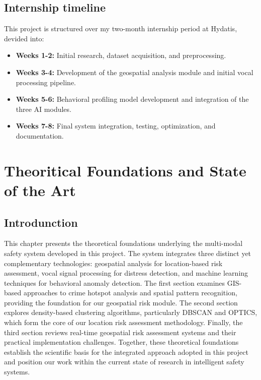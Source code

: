 \documentclass[12pt,a4paper,oneside,english]{book}
\begin{document}
{\section{Internship timeline }%

This project is structured over my two-month internship period at Hydatis, devided into:
\begin{itemize}
    \item \textbf{Weeks 1-2:} Initial research, dataset acquisition, and preprocessing.
    \item \textbf{Weeks 3-4:} Development of the geospatial analysis module and initial vocal processing pipeline.
    \item \textbf{Weeks 5-6:} Behavioral profiling model development and integration of the three AI modules.
    \item \textbf{Weeks 7-8:} Final system integration, testing, optimization, and documentation.
\end{itemize}


\chapter{Theoritical Foundations and State of the Art}
\label{ch:3eme}

\section*{Introdunction}
This chapter presents the theoretical foundations underlying the multi-modal safety system developed in this project. 
The system integrates three distinct yet complementary technologies: geospatial analysis for location-based risk assessment, vocal signal processing for distress detection, and machine learning techniques for behavioral anomaly detection.
The first section examines GIS-based approaches to crime hotspot analysis and spatial pattern recognition, providing the foundation for our geospatial risk module. 
The second section explores density-based clustering algorithms, particularly DBSCAN and OPTICS, which form the core of our location risk assessment methodology. 
Finally, the third section reviews real-time geospatial risk assessment systems and their practical implementation challenges.
Together, these theoretical foundations establish the scientific basis for the integrated approach adopted in this project and position our 
work within the current state of research in intelligent safety systems.
}
\end{document}

